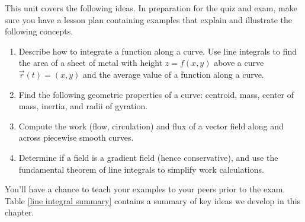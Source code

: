 \newcommand{\sagephysicalpropertiesthreed}%
{http://aleph.sagemath.org/?z=eJx9Vk2PqzYU3ftXWNNIMRNPJslrN5VYTTcjtRvUXZKHPOAk6GGgtpNij-a_99p8BcJrNsH3Hh_fD58LkiuuSYBuTJJlTQ3VywClvFCZNsStbRDWK7OySIY3nuhSkv3uOSkV0QHFu2eVFf5JHwOEfpEh6UAbuqObY_DSrbd0S78dg-BZryYmpJVmUocbpHmRht-eqwzpWLLizEOiaeOlzueOwH9yvVRYsB8cM3y6FonOygLL7HzRuDydsC4xv7H8yjQACpwVmp8ly3F54xLrS6ZwcpU3voYsTzjPCh53ENI-wEG_Iww_yfVVFjiKSHEVXGYJywfwHXqtrh-K1KHcb44UG_jfHqmFv93RlaZJAPsMAAFZyLiSmeA4xGl2OhFJNRRdhf1iXZRSQFdUOA4wVQFKeKFlmaVxPXHWz-B-VQPATABmCrATgG0BqQjHVwDsSExjEQFit3PcIiEXAVuRKAXQx-yjvOrY2LjKWcEfI4XNI2Q9jzQzSDOLtB7pUuMyFkypuHYhzUXzKkY4M8XV8zj7gDM9Dr1Pu0HM993Kft8FPq73aS9IPXJPO-HdpnNHLhX1j9TkvX51a9OvjV_bfm3dGp1kKbBiZ74WmUrWFy1ynImqlBqEoy9xxaQCdYCMKoScd63ZR87JHu1FReTTH21PF4eU55q5WxAsnuAut80-0hb45qQEMJA0ljAIHEj23oVeYK9jt7WV9OBsNi3bXbjVxOBP1YKCxPNM65zjj8zJGzOZ5Lw464uPRg1otcAvY-_gfGsvPCZJWYAaC90lEkDsOT9pcjhJlnxuvz7F1wG6gOsDTRWdWo234qnZOvPBj6AmFzKIlA5yHB5tcJemCJsqQzo-h0nG7u75ZMWwB7a4c0f7OtwAYzDx4A50uUKqk7hh41OAociDjNcFuYvtr_jT2K_msBoi8Od4CWAvAbwwdoG9CPzRc2obsdUdm5llq3_KVs-ymZbNzrOZn7KZCdub13lX7tGl2Arc5J-KtvOdxTxYXBwP96CfRxSPxs54eX8l3v3s8oz9GHEZOsr3-kh7mGnS74dJDzJ3IHsHciOlw9jhwAheJgc3QD7h6Ffx5QHRcFLkTmr9MHG-vNvcuW3vto07skfk3nSoCmHYMME1vD6h6KWGF1w3C6h7Hyc_Cq5U-GuAqlVYlRAq-f-yjatGkzIvZbiUPF1Sv11lloe_baZ8rRzxvB7B3vCcJefFkuIHKjegyR6-azb0xc_ayBU0chWFQjjz1HqkkqXZVYWRpWXFEpBXuFlv79laJtfkyDUQWOATYj9nHdjqezY6insc6X2cDY-P9NE6cJs5bldb6KW6lP-SCsaFquALDloIX17hlrKaq_BveeUB-g_6R3nE&lang=sage}



\noindent 
This unit covers the following ideas. In preparation for the quiz and exam, make sure you have a lesson plan containing examples that explain and illustrate the following concepts.  
\begin{enumerate}
\item Describe how to integrate a function along a curve. Use line integrals to find the area of a sheet of metal with height $z=f(x,y)$ above a curve $\vec r(t)=\left(x,y\right)$ and the average value of a function along a curve.
\item Find the following geometric properties of a curve: centroid, mass, center of mass, inertia, and radii of gyration.
\item Compute the work (flow, circulation) and flux of a vector field along and across piecewise smooth curves.
\item Determine if a field is a gradient field (hence conservative), and use the fundamental theorem of line integrals to simplify work calculations.
\end{enumerate}
You'll have a chance to teach your examples to your peers prior to the exam. Table \ref{line integral summary} contains a summary of key ideas we develop in this chapter.


